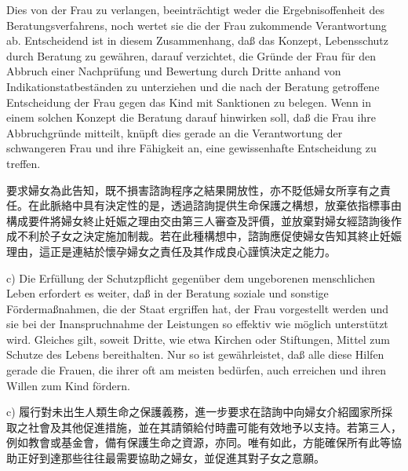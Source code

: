 \documentclass[12pt]{article}
\begin{document}
\begin{sourcepara}[title={原文D.117}]
Dies von der Frau zu verlangen, beeinträchtigt weder die Ergebnisoffenheit des Beratungsverfahrens, noch wertet sie die der Frau zukommende Verantwortung ab. Entscheidend ist in diesem Zusammenhang, daß das Konzept, Lebensschutz durch Beratung zu gewähren, darauf verzichtet, die Gründe der Frau für den Abbruch einer Nachprüfung und Bewertung durch Dritte anhand von Indikationstatbeständen zu unterziehen und die nach der Beratung getroffene Entscheidung der Frau gegen das Kind mit Sanktionen zu belegen. Wenn in einem solchen Konzept die Beratung darauf hinwirken soll, daß die Frau ihre Abbruchgründe mitteilt, knüpft dies gerade an die Verantwortung der schwangeren Frau und ihre Fähigkeit an, eine gewissenhafte Entscheidung zu treffen.
\end{sourcepara}
\begin{transpara}
要求婦女為此告知，既不損害諮詢程序之結果開放性，亦不貶低婦女所享有之責任。在此脈絡中具有決定性的是，透過諮詢提供生命保護之構想，放棄依指標事由構成要件將婦女終止妊娠之理由交由第三人審查及評價，並放棄對婦女經諮詢後作成不利於子女之決定施加制裁。若在此種構想中，諮詢應促使婦女告知其終止妊娠理由，這正是連結於懷孕婦女之責任及其作成良心謹慎決定之能力。
\end{transpara}

\begin{sourcepara}[title={原文D.118}]
c) Die Erfüllung der Schutzpflicht gegenüber dem ungeborenen menschlichen Leben erfordert es weiter, daß in der Beratung soziale und sonstige Fördermaßnahmen, die der Staat ergriffen hat, der Frau vorgestellt werden und sie bei der Inanspruchnahme der Leistungen so effektiv wie möglich unterstützt wird. Gleiches gilt, soweit Dritte, wie etwa Kirchen oder Stiftungen, Mittel zum Schutze des Lebens bereithalten. Nur so ist gewährleistet, daß alle diese Hilfen gerade die Frauen, die ihrer oft am meisten bedürfen, auch erreichen und ihren Willen zum Kind fördern.
\end{sourcepara}
\begin{transpara}
c) 履行對未出生人類生命之保護義務，進一步要求在諮詢中向婦女介紹國家所採取之社會及其他促進措施，並在其請領給付時盡可能有效地予以支持。若第三人，例如教會或基金會，備有保護生命之資源，亦同。唯有如此，方能確保所有此等協助正好到達那些往往最需要協助之婦女，並促進其對子女之意願。
\end{transpara}
\end{document}
